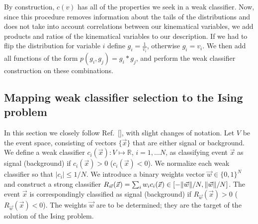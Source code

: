 \documentclass[.chapters/Higgs/.chapters/Higgs/main.tex]{subfiles}
\begin{document}
 By construction, $c(v)$ has all of the properties we seek in a weak classifier. Now, since this procedure removes information about the tails of the distributions and does not take into account correlations between our kinematical variables, we add products and ratios of the kinematical variables to our description. If we had to flip the distribution for variable $i$ define $g_i = \frac{1}{v_i}$, otherwise $g_i=v_i$. We then add all functions of the form $p(g_i,g_j) = g_i*g_j$, and perform the weak classifier construction on these combinations.

\subsection*{Mapping weak classifier selection to the Ising problem}
In this section we closely follow Ref.~[], with slight changes of notation. Let $V$ be the event space, consisting of vectors $\{\vec{x}\}$ that are either signal or background. We define a weak classifier $c_i(\vec{x}):V\mapsto \mathbb{R}$, $i=1,\dots N$, as classifying event $\vec{x}$ as signal (background) if $c_i(\vec{x})>0$ ($c_i(\vec{x})<0$). We normalize each weak classifier so that $|c_i|\leq 1/N$. We introduce a binary weights vector $\vec{w} \in \{0,1\}^N$ and construct a strong classifier $R_{\vec{w}}(\vec{x}) = \sum_i w_i c_i(\vec{x})\in[-{\norm{\vec{w}}}/{N},{\norm{\vec{w}}}/{N}]$. The event $\vec{x}$ is correspondingly classified as signal (background) if $R_{\vec{w}}(\vec{x})>0$ ($R_{\vec{w}}(\vec{x})<0$). The weights $\vec{w}$ are to be determined; they are the target of the solution of the Ising problem.
\end{document}
